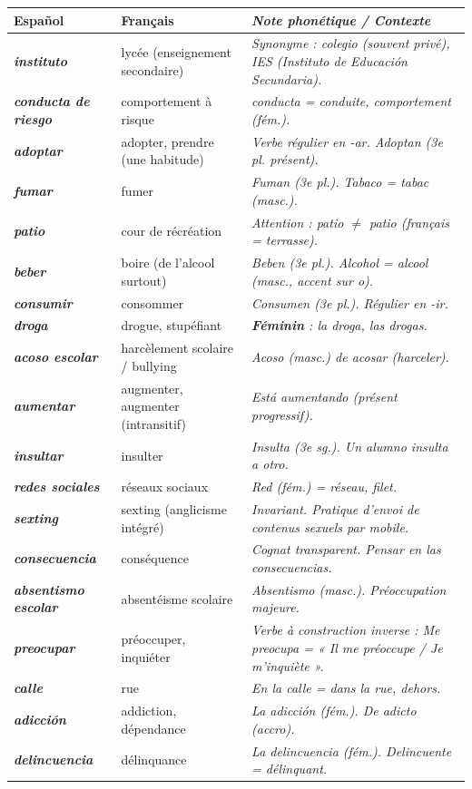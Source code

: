 \documentclass[11pt]{article}
\newcommand{\esp}[1]{\ifmmode\text{\textit{#1}}\else\begingroup\selectlanguage{spanish}\itshape #1\endgroup\fi}
\begin{document}
\begin{center}
\begin{tabularx}{\linewidth}{|>{\bfseries}l|X|>{\itshape}X|}
\hline
\rowcolor{popblueL}
\textbf{Español} & \textbf{Français} & \textbf{Note phonétique / Contexte} \\
\hline
\esp{instituto} & lycée (enseignement secondaire) & Synonyme : \esp{colegio} (souvent privé), \esp{IES} (Instituto de Educación Secundaria). \\
\esp{conducta de riesgo} & comportement à risque & \esp{conducta} = conduite, comportement (fém.). \\
\esp{adoptar} & adopter, prendre (une habitude) & Verbe régulier en \esp{-ar}. \esp{Adoptan} (3e pl. présent). \\
\esp{fumar} & fumer & \esp{Fuman} (3e pl.). \esp{Tabaco} = tabac (masc.). \\
\esp{patio} & cour de récréation & Attention : \esp{patio} $\neq$ patio (français = terrasse). \\
\esp{beber} & boire (de l'alcool surtout) & \esp{Beben} (3e pl.). \esp{Alcohol} = alcool (masc., accent sur \emph{o}). \\
\esp{consumir} & consommer & \esp{Consumen} (3e pl.). Régulier en \esp{-ir}. \\
\esp{droga} & drogue, stupéfiant & \textbf{Féminin} : \esp{la droga}, \esp{las drogas}. \\
\esp{acoso escolar} & harcèlement scolaire / bullying & \esp{Acoso} (masc.) de \esp{acosar} (harceler). \\
\esp{aumentar} & augmenter, augmenter (intransitif) & \esp{Está aumentando} (présent progressif). \\
\esp{insultar} & insulter & \esp{Insulta} (3e sg.). \esp{Un alumno insulta a otro}. \\
\esp{redes sociales} & réseaux sociaux & \esp{Red} (fém.) = réseau, filet. \\
\esp{sexting} & sexting (anglicisme intégré) & Invariant. Pratique d'envoi de contenus sexuels par mobile. \\
\esp{consecuencia} & conséquence & Cognat transparent. \esp{Pensar en las consecuencias}. \\
\esp{absentismo escolar} & absentéisme scolaire & \esp{Absentismo} (masc.). Préoccupation majeure. \\
\esp{preocupar} & préoccuper, inquiéter & Verbe à construction inverse : \esp{Me preocupa} = « Il me préoccupe / Je m'inquiète ». \\
\esp{calle} & rue & \esp{En la calle} = dans la rue, dehors. \\
\esp{adicción} & addiction, dépendance & \esp{La adicción} (fém.). De \esp{adicto} (accro). \\
\esp{delincuencia} & délinquance & \esp{La delincuencia} (fém.). \esp{Delincuente} = délinquant. \\
\hline
\end{tabularx}
\end{center}
\end{document}
